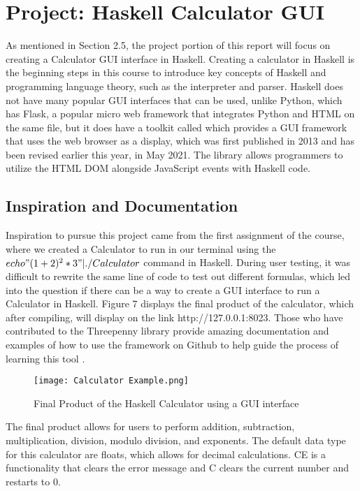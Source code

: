 \documentclass{article}
\begin{document}
\section{Project: Haskell Calculator GUI}

As mentioned in Section 2.5, the project portion of this report will focus on creating a Calculator GUI interface in Haskell. Creating a calculator in Haskell is the beginning steps in this course to introduce key concepts of Haskell and programming language theory, such as the interpreter and parser. Haskell does not have many popular GUI interfaces that can be used, unlike Python, which has Flask, a popular micro web framework that integrates Python and HTML on the same file, but it does have a toolkit called \cite{Threepenny} which provides a GUI framework that uses the web browser as a display, which was first published in 2013 and has been revised earlier this year, in May 2021. The library allows programmers to utilize the HTML DOM alongside JavaScript events with Haskell code.

\subsection{Inspiration and Documentation}
Inspiration to pursue this project came from the first assignment of the course, where we created a Calculator to run in our terminal using the $echo "(1+2)^2 *3" | ./Calculator$ command in Haskell. During user testing, it was difficult to rewrite the same line of code to test out different formulas, which led into the question if there can be a way to create a GUI interface to run a Calculator in Haskell. Figure 7 displays the final product of the calculator, which after compiling, will display on the link http://127.0.0.1:8023. Those who have contributed to the Threepenny library provide amazing documentation and examples of how to use the framework on Github to help guide the process of learning this tool \cite{ThreepennyElectron} \cite{ThreepennyCalc} \cite{ThreepennyExample}.

\begin{figure}[H]
    \centering
    \texttt{[image: Calculator Example.png]}
    \caption{Final Product of the Haskell Calculator using a GUI interface}
    \label{fig:calc}
\end{figure}

\noindent
The final product allows for users to perform addition, subtraction, multiplication, division, modulo division, and exponents. The default data type for this calculator are floats, which allows for decimal calculations. CE is a functionality that clears the error message and C clears the current number and restarts to 0.
\end{document}
